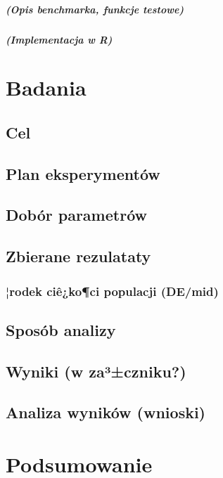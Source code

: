 \documentclass[11pt]{report}
\begin{document}
\paragraph{
(Opis benchmarka, funkcje testowe)
}
\paragraph{
(Implementacja w R)
}


\chapter{Badania}
\section{Cel}
\section{Plan eksperymentów}
\section{Dobór parametrów}
\section{Zbierane rezulataty}
\subsection{¦rodek ciê¿ko¶ci populacji (DE/mid)}
\section{Sposób analizy}

\section{Wyniki (w za³±czniku?)}
\section{Analiza wyników (wnioski)}

\chapter{Podsumowanie}



\nocite{*}

\end{document}
